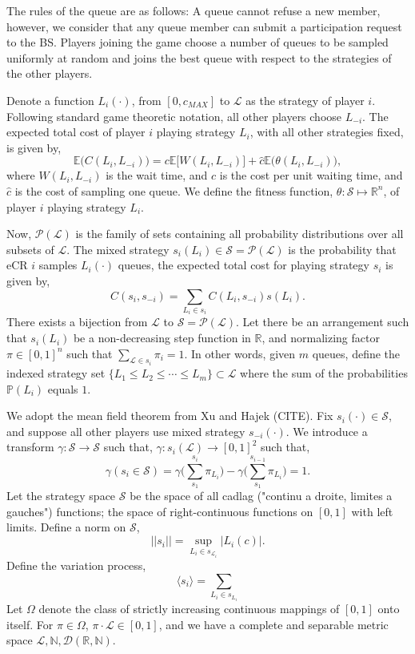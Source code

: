\documentclass[10pt]{article}
\newcommand{\mcL}{\mathcal{L}}
\newcommand{\mcP}{\mathcal{P}}
\newcommand{\mcS}{\mathcal{S}}
\newcommand{\mcD}{\mathcal{D}}
\theoremstyle{definition}
\begin{document}
The rules of the queue are as follows:
A queue cannot refuse a new member, however, we
consider that any queue member can submit a participation request to the BS.
Players joining the game choose a number of queues to be sampled uniformly at random and joins the best queue with respect
to the strategies of the other players. 

Denote a function $L_i(\cdot)$, from
$[0, c_{MAX}]$ to $\mcL$ as the strategy of player $i$. Following
standard game theoretic notation, all other players choose $L_{-i}$.
The expected total cost of player $i$ playing 
strategy $L_i$, with all other strategies fixed, is given by, 
$$
    \mathbb{E}\big(C(L_i,L_{-i})\big) = c\mathbb{E}\lbrack W(L_i,L_{-i})\rbrack + \hat c
    \mathbb{E}\big(\theta(L_i,L_{-i})\big),
$$
where $W(L_i,L_{-i})$ is the wait time, and
$c$ is the cost per unit waiting time, and $\hat c$ is the cost of sampling one queue. 
We define the fitness function, $\theta:\mcS \mapsto \mathbb{R}^n$, of player $i$ playing strategy $L_i$. 

Now, $\mcP(\mcL)$ is the family of sets containing all probability distributions over
all subsets of $\mcL$. The mixed
strategy $s_i(L_i) \in \mcS=\mcP(\mcL)$ is the probability that
eCR $i$ samples $L_i(\cdot)$ queues, 
the expected total cost for playing strategy $s_i$ is given by,
$$
    C(s_i, s_{-i}) = \displaystyle \sum_{L_i \in s_i} C(L_i,s_{-i})s(L_i).
$$
There exists a bijection from $\mcL$ to $\mcS=\mcP(\mcL)$. Let there be an
arrangement such that $s_i(L_i)$ be a non-decreasing step function in
$\mathbb{R}$, and normalizing factor $\pi \in [0,1]^n$ such that $\sum_{\mcL \in
s_i} \pi_i = 1$. In other words, given $m$ queues, 
define the indexed strategy set $\lbrace L_1 \le L_2 \le\cdots \le L_m\rbrace
\subset \mcL$ where the sum of the probabilities $\mathbb{P}(L_i)$ equals $1$.

We adopt the mean field theorem from Xu and Hajek (CITE).
Fix $s_i(\cdot) \in \mcS$, and suppose all other players use mixed strategy
$s_{-i}(\cdot)$. 
We introduce a transform $\gamma: \mcS \rightarrow \mcS$ such that,
$\gamma: s_i(\mcL) \rightarrow [0,1]^2$ such that,
$$
    \gamma(s_i \in \mcS) = \gamma\bigg(\displaystyle\sum_{s_1}^{s_i} \pi_{L_i} \bigg)-
    \gamma\bigg(\displaystyle\sum_{s_1}^{s_{i-1}}\pi_{L_i}\bigg) = 1.
$$
Let the strategy space $\mcS$ be the space of all cadlag ("continu a droite, limites a
gauches") functions; the space of right-continuous functions on $[0,1]$ with left
limits. Define a norm on $\mcS$, 
$$
    \vert\vert s_i \vert\vert = \sup_{L_i \in s_{\mcL_i}} \vert L_i(c)\vert.
$$
Define the variation process,
$$
    \langle s_i\rangle = \displaystyle\sum_{L_i \in s_{L_i}}
$$
Let $\Omega$ denote the class of strictly increasing continuous mappings of $[0,1]$ onto
itself. For $\pi \in \Omega$, $\pi \cdot \mcL \in [0,1]$, and we have a complete 
and separable metric space $\mcL, \mathbb{N}, \mcD(\mathbb{R},\mathbb{N})$.
\end{document}
